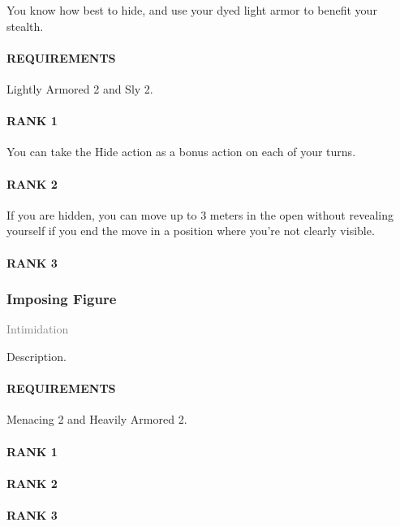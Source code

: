 \normalsize
You know how best to hide, and use your dyed light armor to benefit your stealth.
\paragraph{REQUIREMENTS} Lightly Armored 2 and Sly 2.
\paragraph{RANK 1} You can take the Hide action as a bonus action on each of your turns.
\paragraph{RANK 2} If you are hidden, you can move up to 3 meters in the open without revealing yourself if you end the move in a position where you're not clearly visible.
\paragraph{RANK 3}

\subsubsection{Imposing Figure} \label{feat::imposingfigure}
\small{\textcolor{gray}{Intimidation}}

\normalsize
Description.
\paragraph{REQUIREMENTS} Menacing 2 and Heavily Armored 2.
\paragraph{RANK 1}
\paragraph{RANK 2}
\paragraph{RANK 3}


